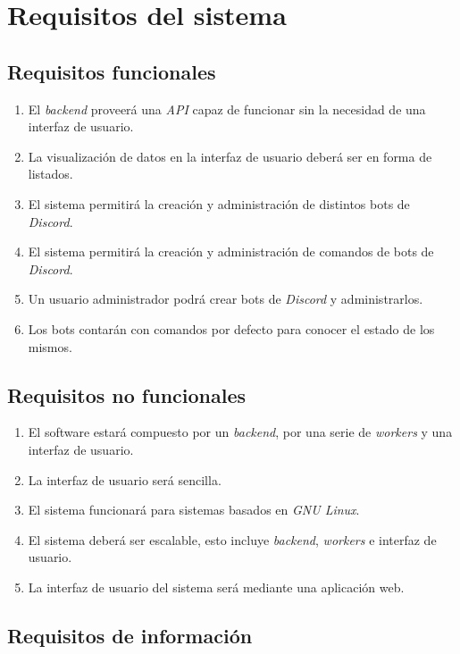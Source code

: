 \section{Requisitos del sistema}

\subsection{Requisitos funcionales}

\begin{enumerate}
	\item El \textit{backend} proveerá una \textit{API} capaz de funcionar sin la necesidad de una interfaz de usuario.
	\item La visualización de datos en la interfaz de usuario deberá ser en forma de listados.
	\item El sistema permitirá la creación y administración de distintos bots de \textit{Discord}.
	\item El sistema permitirá la creación y administración de comandos de bots de \textit{Discord}.
	\item Un usuario administrador podrá crear bots de \textit{Discord} y administrarlos.
	\item Los bots contarán con comandos por defecto para conocer el estado de los mismos.
\end{enumerate}

\subsection{Requisitos no funcionales}

\begin{enumerate}
	\item El software estará compuesto por un \textit{backend}, por una serie de \textit{workers} y una interfaz de usuario.
	\item La interfaz de usuario será sencilla.
	\item El sistema funcionará para sistemas basados en \textit{GNU Linux}.
	\item El sistema deberá ser escalable, esto incluye \textit{backend}, \textit{workers} e interfaz de usuario.
	\item La interfaz de usuario del sistema será mediante una aplicación web.
\end{enumerate}

\subsection{Requisitos de información}

